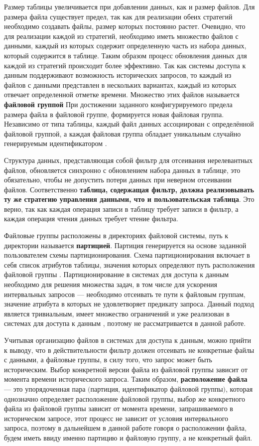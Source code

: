 Размер таблицы увеличивается при добавлении данных, как и размер файлов. Для размера файла существует предел, так как для реализации обеих стратегий необходимо создавать файлы, размер которых постоянно растет. Очевидно, что для реализации каждой из стратегий, необходимо иметь множество файлов с данными, каждый из которых содержит определенную часть из набора данных, который содержится в таблице. Таким образом процесс обновления данных для каждой из стратегий происходит более эффективно. Так как системы доступа к данным поддерживают возможность исторических запросов, то каждый из файлов с данными представлен в нескольких вариантах, каждый из которых отвечает определенной отметке времени. Множество этих файлов называется \textbf{файловой группой} При достижении заданного конфигурируемого предела размера файла в файловой группе, формируется новая файловая группа. Независимо от типа таблицы, каждый файл данных ассоциирован с определённой файловой группой, а каждая файловая группа обладает уникальным случайно генерируемым идентификатором \cite{Hudi_File_layouts}.

Структура данных, представляющая собой фильтр для отсеивания нерелевантных файлов, обновляется синхронно с обновлением набора данных в таблице, это обязательно, чтобы не допустить потери данных при неверном отсеивании файлов. Соответственно \textbf{таблица, содержащая фильтр, должна реализовывать ту же стратегию управления данными, что и пользовательская таблица}. Это верно, так как каждая операция записи в таблицу требует записи в фильтр, а каждая операция чтения данных требует чтение фильтра.

Файловые группы расположены в директориях файловой системы, путь к директории называется \textbf{партицией}. Партиция генерируется на основе заданной пользователем схемы партиционирования. Схема партиционирования включает в себя список атрибутов таблицы, значения которых определяют путь расположения файловой группы \cite{Hudi_File_layouts}. Партиционирование в системах для доступа к данным необходимо для решения множества задач, в том числе для ускорения интервальных запросов --- необходимо отсеивать те пути к файловым группам, значение атрибута в которых не удовлетворяет предикату запроса. Данный подход является тривиальным, имеет множество ограничений и уже реализован в системах для доступа к данным \cite{Spatial_big_data_architecture}, поэтому не рассматривается в данной работе.

Учитывая организацию файлов в системах для доступа к данным, можно прийти к выводу, что в действительности фильтр должен отсеивать не конкретные файлы с данными, а файловые группы, в силу того, что запрос может быть историческим. Выбор конкретной версии файла из файловой группы зависит от момента времени исторического запроса. Таким образом, \textbf{расположение файла} --- это упорядоченная пара $($партиция, идентификатор файловой группы$)$, которая однозначно определяет расположение файловой группы, выбор же конкретного файла из файловой группы зависит от момента времени, запрашиваемого в историческом запросе, этот процесс не зависит от условия интервального запроса, поэтому в дальнейшем в данной работе говоря о расположении файла, будем иметь ввиду именно партицию и файловую группу, а не конкретный файл. 


